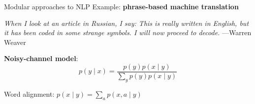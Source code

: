 \documentclass[usenames,dvipsnames,11pt,aspectratio=169]{beamer}
\newcommand{\pdfnote}[1]{}
\begin{document}
\begin{frame}
    {Modular approaches to NLP}
    Example: \textbf{phrase-based machine translation}

    \textit{When I look at an article in Russian, I say: This is really written in English, but it has been coded in some strange symbols. I will now proceed to decode.} ---Warren Weaver

    \textbf{Noisy-channel model}:
    $$
    p(y\mid x) = \frac{p(y)p(x\mid y)}{\sum_y p(y)p(x\mid y)}
    $$
    \pdfnote{
        We consider the Foreign language x as the noised version of English y, which we will decode.
        The probability of the unobserved true signal y (target English sentence) given the observed noisy signal (source Foreign sentence) is given by Bayes rule. Here p(y) is the prior over English sentences, which is given by a language model.
        p(x | y) is the translation model, which is modeled by latent word alignments.
    }
    \pdfnote{
        Question: how would you model p(x, a | y)?
        Key idea: decomposition!
        p(french word | aligned english word) x
        p(french word position | english word position)
    }

    Word alignment: $p(x\mid y) = \sum_a p(x,a\mid y)$
    
\end{frame}
\end{document}
